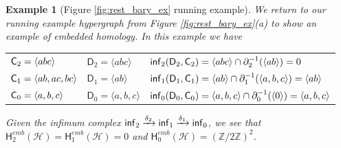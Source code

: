 \documentclass{amsart}
\newtheorem{example}[theorem]{Example}
\newcommand{\Z}{\mathbb{Z}}
\newcommand{\Cgroup}        {\mm{\sf C}}
\newcommand{\Dgroup}	    {\mathsf{D}}
\newcommand{\Hgroup}	     {\mathsf{H}}
\renewcommand{\hom}[2]{\Hgroup_{#2}^{#1}}
\renewcommand{\H}{\mathcal{H}}
\newcommand{\bdr}{\mm{\mathrm{\partial}}}
\newcommand {\mm}[1]        {\ifmmode{#1}\else{\mbox{\(#1\)}}\fi}
\newcommand{\infgroup}{\mm{\mathsf{inf}}}
\begin{document}
\begin{example}[Figure \ref{fig:rest_bary_ex} running example]
We return to our running example hypergraph from Figure \ref{fig:rest_bary_ex}(a) to show an example of embedded homology. In this example we have
\begin{center}
\begin{tabular}{lll}
    $\Cgroup_2 = \langle abc \rangle$        & $\Dgroup_2 = \langle abc \rangle$     & $\infgroup_2(\Dgroup_2, \Cgroup_2) = \langle abc \rangle \cap \bdr_2^{-1}(\langle ab \rangle)      = 0$ \\
    $\Cgroup_1 = \langle ab, ac, bc \rangle$ & $\Dgroup_1 = \langle ab \rangle$      & $\infgroup_1(\Dgroup_1, \Cgroup_1) = \langle  ab \rangle \cap \bdr_1^{-1}(\langle a, b, c \rangle) = \langle ab \rangle$ \\
    $\Cgroup_0 = \langle a, b, c \rangle$    & $\Dgroup_0 = \langle a, b, c \rangle$ & $\infgroup_0(\Dgroup_0, \Cgroup_0) = \langle a, b, c \rangle \cap \bdr_0^{-1}(\langle 0\rangle)                   = \langle a, b, c \rangle$
\end{tabular}
\end{center}
Given the infimum complex $\infgroup_2 \xrightarrow{\delta_2} \infgroup_1 \xrightarrow{\delta_1} \infgroup_0$, we see that $\hom{emb}{2}(\H) = \hom{emb}{1}(\H) = 0$ and $\hom{emb}{0}(\H) = (\Z/2\Z)^2$.
\end{example}
\end{document}
